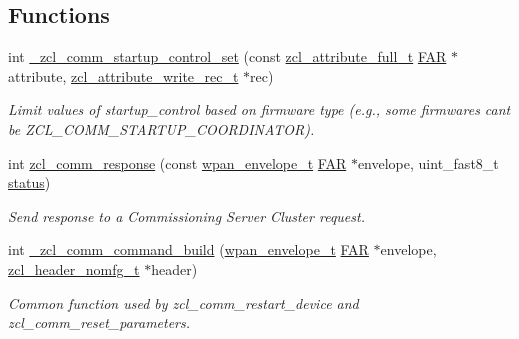 \subsection*{Functions}
\begin{DoxyCompactItemize}
\item 
int \hyperlink{group__zcl__commissioning_gae3180284d1a5a9af2176173a58cc1f4c}{\+\_\+zcl\+\_\+comm\+\_\+startup\+\_\+control\+\_\+set} (const \hyperlink{structzcl__attribute__full__t}{zcl\+\_\+attribute\+\_\+full\+\_\+t} \hyperlink{group__hal_gaef060b3456fdcc093a7210a762d5f2ed}{F\+AR} $\ast$attribute, \hyperlink{structzcl__attribute__write__rec__t}{zcl\+\_\+attribute\+\_\+write\+\_\+rec\+\_\+t} $\ast$rec)
\begin{DoxyCompactList}\small\item\em Limit values of startup\+\_\+control based on firmware type (e.\+g., some firmwares can\textquotesingle{}t be Z\+C\+L\+\_\+\+C\+O\+M\+M\+\_\+\+S\+T\+A\+R\+T\+U\+P\+\_\+\+C\+O\+O\+R\+D\+I\+N\+A\+T\+OR). \end{DoxyCompactList}\item 
\mbox{\label{group__zcl__commissioning_ga57f9aaf3da6dc9b513f7f9ccbb473a0b}} 
int \hyperlink{group__zcl__commissioning_ga57f9aaf3da6dc9b513f7f9ccbb473a0b}{zcl\+\_\+comm\+\_\+response} (const \hyperlink{structwpan__envelope__t}{wpan\+\_\+envelope\+\_\+t} \hyperlink{group__hal_gaef060b3456fdcc093a7210a762d5f2ed}{F\+AR} $\ast$envelope, uint\+\_\+fast8\+\_\+t \hyperlink{group__xbee__atcmd_gade818037fd6c985038ff29656089758d}{status})
\begin{DoxyCompactList}\small\item\em Send response to a Commissioning Server Cluster request. \end{DoxyCompactList}\item 
int \hyperlink{group__zcl__commissioning_ga0eeed24c2ca26aa030876addc4caf67d}{\+\_\+zcl\+\_\+comm\+\_\+command\+\_\+build} (\hyperlink{structwpan__envelope__t}{wpan\+\_\+envelope\+\_\+t} \hyperlink{group__hal_gaef060b3456fdcc093a7210a762d5f2ed}{F\+AR} $\ast$envelope, \hyperlink{group__zcl_gae988eb59c8a2e75b6cb34aefeca315d1}{zcl\+\_\+header\+\_\+nomfg\+\_\+t} $\ast$header)
\begin{DoxyCompactList}\small\item\em Common function used by zcl\+\_\+comm\+\_\+restart\+\_\+device and zcl\+\_\+comm\+\_\+reset\+\_\+parameters. \end{DoxyCompactList}\item 

\end{DoxyCompactItemize}
